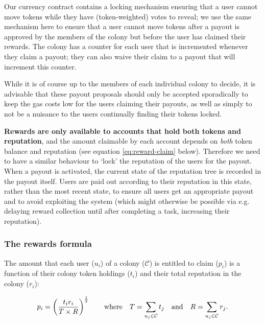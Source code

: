Our currency contract contains a locking mechanism ensuring that a user cannot move tokens while they have (token-weighted) votes to reveal; we use the same mechanism here to ensure that a user cannot move tokens after a payout is approved by the members of the colony but before the user has claimed their rewards. The colony has a counter for each user that is incremented whenever they claim a payout; they can also waive their claim to a payout that will increment this counter.

While it is of course up to the members of each individual colony to decide, it is advisable that these payout proposals should only be accepted sporadically to keep the gas costs low for the users claiming their payouts, as well as simply to not be a nuisance to the users continually finding their tokens locked.

\textbf{Rewards are only available to accounts that hold both tokens and reputation}, and the amount claimable by each account depends on \emph{both} token balance and reputation (see equation \eqref{eq:reward-claim} below). Therefore we need to have a similar behaviour to `lock' the reputation of the users for the payout. When a payout is activated, the current state of the reputation tree is recorded in the payout itself. Users are paid out according to their reputation in this state, rather than the most recent state, to ensure all users get an appropriate payout and to avoid exploiting the system (which might otherwise be possible via e.g. delaying reward collection until after completing a task, increasing their reputation).

\subsubsection*{The rewards formula}

The amount that each user ($u_i$) of a colony ($\mathcal{C}$) is entitled to claim ($p_i$) is a function of their colony token holdings ($t_i$) and their total reputation in the colony ($r_i$):

\begin{equation}\label{eq:reward-claim}
 p_i = \left(\frac{t_i r_i}{T \times R}\right)^{\frac{1}{2}} \qquad \textnormal{where} \quad T = \sum\limits_{u_j\in \mathcal{C}} t_j \quad\textnormal{and}\quad R = \sum\limits_{u_j\in \mathcal{C}} r_j.
\end{equation}

